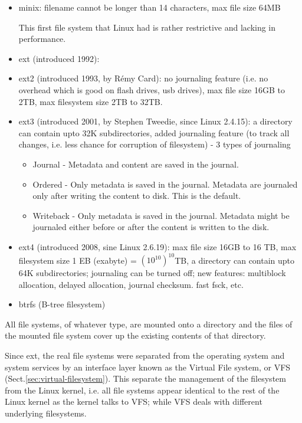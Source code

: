 \begin{itemize}
  \item minix: filename cannot be longer than 14 characters, max file size 64MB
  
  This first file system that Linux had is rather restrictive and lacking in
  performance.
  
  \item ext (introduced 1992):
  

  
  \item ext2 (introduced 1993, by Rémy Card): no journaling feature (i.e. no
  overhead which is good on flash drives, usb drives), max file size 16GB to
  2TB, max filesystem size 2TB to 32TB.
  
  \item ext3 (introduced 2001, by Stephen Tweedie, since Linux 2.4.15):
  a directory can contain upto 32K subdirectories, 
  added journaling feature (to track all changes, i.e. less chance for
  corruption of filesystem) - 3 types of journaling
  \begin{itemize}
    \item Journal - Metadata and content are saved in the journal.

    \item Ordered - Only metadata is saved in the journal. Metadata are 
    journaled only after writing the content to disk. This is the default.
    
    \item Writeback - Only metadata is saved in the journal. Metadata might be 
    journaled either before or after the content is written to the disk.
  \end{itemize}
  
   \item ext4 (introduced 2008, sine Linux 2.6.19): max file size 16GB to 16 TB,
   max filesystem size 1 EB (exabyte) = $(10^{10})^{10}$TB, a directory can
   contain upto 64K subdirectories; journaling can be turned off; new features: 
   multiblock  allocation, delayed allocation, journal checksum. fast fsck, etc.
   
   \item btrfs (B-tree filesystem)
\end{itemize}


All file systems, of whatever type, are mounted onto a directory and the files
of the mounted file system cover up the existing contents of that directory.

Since ext, the real file systems were separated from the operating system and
system services by an interface layer known as the Virtual File system, or VFS
(Sect.\ref{sec:virtual-filesystem}). This separate the management of the
filesystem from the Linux kernel, i.e. all file systems appear identical to the
rest of the Linux kernel as the kernel talks to VFS; while VFS deals with
different underlying filesystems.


